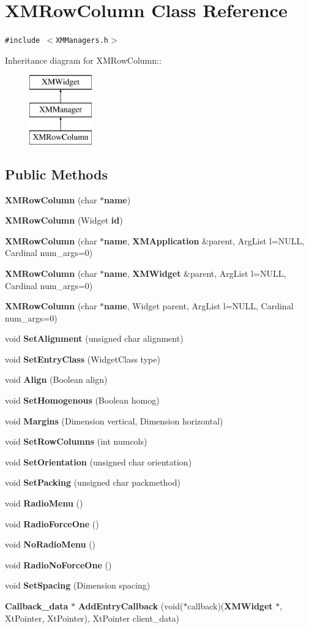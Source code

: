 \section{XMRow\-Column  Class Reference}
\label{classXMRowColumn}
{\tt \#include $<$XMManagers.h$>$}

Inheritance diagram for XMRow\-Column::\begin{figure}[H]
\begin{center}
\leavevmode
\includegraphics[height=3cm]{classXMRowColumn}
\end{center}
\end{figure}
\subsection*{Public Methods}
\begin{CompactItemize}
\item 
{\bf XMRow\-Column} (char $\ast${\bf name})
\item 
{\bf XMRow\-Column} (Widget {\bf id})
\item 
{\bf XMRow\-Column} (char $\ast${\bf name}, {\bf XMApplication} \&parent, Arg\-List l=NULL, Cardinal num\_\-args=0)
\item 
{\bf XMRow\-Column} (char $\ast${\bf name}, {\bf XMWidget} \&parent, Arg\-List l=NULL, Cardinal num\_\-args=0)
\item 
{\bf XMRow\-Column} (char $\ast${\bf name}, Widget parent, Arg\-List l=NULL, Cardinal num\_\-args=0)
\item 
void {\bf Set\-Alignment} (unsigned char alignment)
\item 
void {\bf Set\-Entry\-Class} (Widget\-Class type)
\item 
void {\bf Align} (Boolean align)
\item 
void {\bf Set\-Homogenous} (Boolean homog)
\item 
void {\bf Margins} (Dimension vertical, Dimension horizontal)
\item 
void {\bf Set\-Row\-Columns} (int numcols)
\item 
void {\bf Set\-Orientation} (unsigned char orientation)
\item 
void {\bf Set\-Packing} (unsigned char packmethod)
\item 
void {\bf Radio\-Menu} ()
\item 
void {\bf Radio\-Force\-One} ()
\item 
void {\bf No\-Radio\-Menu} ()
\item 
void {\bf Radio\-No\-Force\-One} ()
\item 
void {\bf Set\-Spacing} (Dimension spacing)
\item 
{\bf Callback\_\-data} $\ast$ {\bf Add\-Entry\-Callback} (void($\ast$callback)({\bf XMWidget} $\ast$, Xt\-Pointer, Xt\-Pointer), Xt\-Pointer client\_\-data)
\end{CompactItemize}


